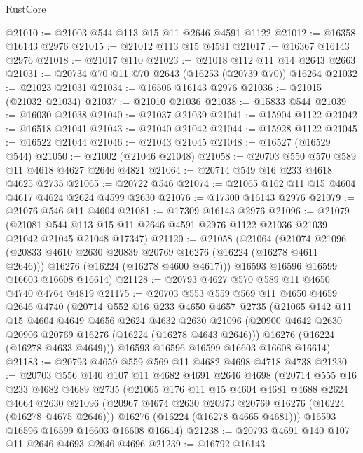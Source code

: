 \begin{lexlean}{RustCore}
\begin{coremodule}
@21010 := @21003 @544 @113 @15 @11 @2646 @4591 @1122
@21012 := @16358 @16143 @2976
@21015 := @21012 @113 @15 @4591
@21017 := @16367 @16143 @2976
@21018 := @21017 @110
@21023 := @21018 @112 @11 @14 @2643 @2663
@21031 := @20734 @70 @11 @70 @2643 (@16253 (@20739 @70)) @16264
@21032 := @21023 @21031
@21034 := @16506 @16143 @2976
@21036 := @21015 (@21032 @21034)
@21037 := @21010 @21036
@21038 := @15833 @544
@21039 := @16030 @21038
@21040 := @21037 @21039
@21041 := @15904 @1122
@21042 := @16518 @21041
@21043 := @21040 @21042
@21044 := @15928 @1122
@21045 := @16522 @21044
@21046 := @21043 @21045
@21048 := @16527 (@16529 @544)
@21050 := @21002 (@21046 @21048)
@21058 := @20703 @550 @570 @589 @11 @4618 @4627 @2646 @4821
@21064 := @20714 @549 @16 @233 @4618 @4625 @2735
@21065 := @20722 @546
@21074 := @21065 @162 @11 @15 @4604 @4617 @4624 @2624 @4599 @2630
@21076 := @17300 @16143 @2976
@21079 := @21076 @546 @11 @4604
@21081 := @17309 @16143 @2976
@21096 := @21079
    (@21081 @544 @113 @15 @11 @2646 @4591 @2976 @1122 @21036 @21039 @21042 @21045 @21048 @17347)
@21120 := @21058
    (@21064
      (@21074
        @21096
        (@20833 @4610 @2630 @20839 @20769 @16276 (@16224 (@16278 @4611 @2646)))
        @16276
        (@16224 (@16278 @4600 @4617)))
      @16593
      @16596
      @16599
      @16603
      @16608
      @16614)
@21128 := @20793 @4627 @570 @589 @11 @4650 @4740 @4764 @4819
@21175 := @20703
    @553
    @559
    @569
    @11
    @4650
    @4659
    @2646
    @4740
    (@20714
      @552
      @16
      @233
      @4650
      @4657
      @2735
      (@21065
        @142
        @11
        @15
        @4604
        @4649
        @4656
        @2624
        @4632
        @2630
        @21096
        (@20900 @4642 @2630 @20906 @20769 @16276 (@16224 (@16278 @4643 @2646)))
        @16276
        (@16224 (@16278 @4633 @4649)))
      @16593
      @16596
      @16599
      @16603
      @16608
      @16614)
@21183 := @20793 @4659 @559 @569 @11 @4682 @4698 @4718 @4738
@21230 := @20703
    @556
    @140
    @107
    @11
    @4682
    @4691
    @2646
    @4698
    (@20714
      @555
      @16
      @233
      @4682
      @4689
      @2735
      (@21065
        @176
        @11
        @15
        @4604
        @4681
        @4688
        @2624
        @4664
        @2630
        @21096
        (@20967 @4674 @2630 @20973 @20769 @16276 (@16224 (@16278 @4675 @2646)))
        @16276
        (@16224 (@16278 @4665 @4681)))
      @16593
      @16596
      @16599
      @16603
      @16608
      @16614)
@21238 := @20793 @4691 @140 @107 @11 @2646 @4693 @2646 @4696
@21239 := @16792 @16143

\end{coremodule}
\end{lexlean}
